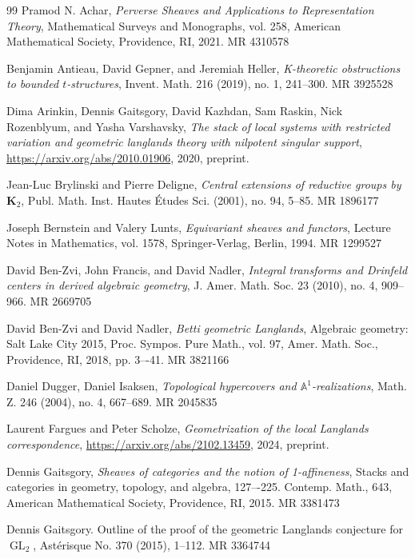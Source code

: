 \documentclass[10pt]{amsart}
\theoremstyle{remark}
\newcommand{\afl}{\mathbb{A}^1}
\newcommand{\on}{\operatorname}
\begin{document}
\begin{thebibliography}{99}
Pramod N. Achar, \emph{Perverse Sheaves and Applications to Representation Theory}, 
  Mathematical Surveys and Monographs, vol. 258, American Mathematical Society, Providence, RI, 2021. MR 4310578

Benjamin Antieau, David Gepner, and Jeremiah Heller, \emph{K-theoretic obstructions to bounded $t$-structures}, 
  Invent. Math. 216 (2019), no. 1, 241--300. MR 3925528

Dima Arinkin, Dennis Gaitsgory, David Kazhdan, Sam Raskin, Nick Rozenblyum, and Yasha
Varshavsky, \emph{The stack of local systems with restricted variation and geometric langlands theory
with nilpotent singular support}, \url{https://arxiv.org/abs/2010.01906}, 2020, preprint.

Jean-Luc Brylinski and Pierre Deligne, \emph{Central extensions of reductive groups by $\mathbf{K}_2$}, Publ. Math.
Inst. Hautes Études Sci. (2001), no. 94, 5–85. MR 1896177

Joseph Bernstein and Valery Lunts, \emph{Equivariant sheaves and functors}, 
  Lecture Notes in Mathematics, vol. 1578, Springer-Verlag, Berlin, 1994. MR 1299527

David Ben-Zvi, John Francis, and David Nadler, \emph{Integral transforms and Drinfeld centers in derived algebraic geometry}, 
  J. Amer. Math. Soc. 23 (2010), no. 4, 909--966. MR 2669705

David Ben-Zvi and David Nadler, \emph{Betti geometric Langlands}, Algebraic geometry: Salt Lake
City 2015, Proc. Sympos. Pure Math., vol. 97, Amer. Math. Soc., Providence, RI, 2018, pp. 3–-41. MR 3821166

Daniel Dugger, Daniel Isaksen, \emph{Topological hypercovers and $\afl$-realizations}, Math. Z. 246 (2004), no. 4, 667–689. MR 2045835

Laurent Fargues and Peter Scholze, \emph{Geometrization of the local Langlands correspondence}, \url{https://arxiv.org/abs/2102.13459}, 2024, preprint.

Dennis Gaitsgory, \emph{Sheaves of categories and the notion of 1-affineness}, 
  Stacks and categories in geometry, topology, and algebra, 127–-225.
Contemp. Math., 643,
American Mathematical Society, Providence, RI, 2015. MR 3381473

Dennis Gaitsgory. Outline of the proof of the geometric Langlands conjecture for $\on{GL}_2$, Astérisque No. 370 (2015), 1–112. MR 3364744


\end{thebibliography}
\end{document}
